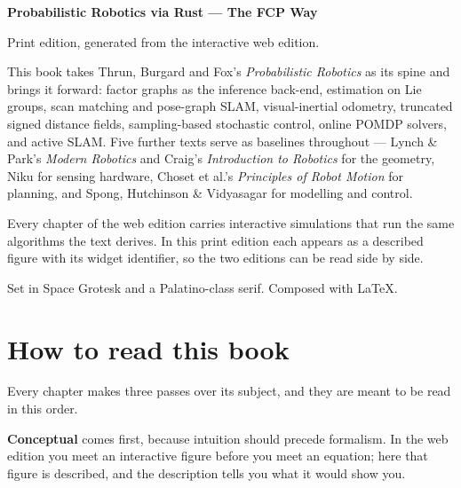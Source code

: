\documentclass[11pt, twoside, openright]{book}
\begin{document}
\cleardoublepage
\thispagestyle{empty}
\vspace*{\fill}
\noindent
{\fontsize{9}{13}\selectfont\color{shInkSecondary}
\textbf{Probabilistic Robotics via Rust --- The FCP Way}\par
\vspace{5pt}
Print edition, generated from the interactive web edition.\par
\vspace{9pt}
This book takes Thrun, Burgard and Fox's \emph{Probabilistic Robotics} as its
spine and brings it forward: factor graphs as the inference back-end, estimation
on Lie groups, scan matching and pose-graph SLAM, visual-inertial odometry,
truncated signed distance fields, sampling-based stochastic control, online
POMDP solvers, and active SLAM. Five further texts serve as baselines throughout
--- Lynch \& Park's \emph{Modern Robotics} and Craig's \emph{Introduction to
Robotics} for the geometry, Niku for sensing hardware, Choset et al.'s
\emph{Principles of Robot Motion} for planning, and Spong, Hutchinson \&
Vidyasagar for modelling and control.\par
\vspace{9pt}
Every chapter of the web edition carries interactive simulations that run the
same algorithms the text derives. In this print edition each appears as a
described figure with its widget identifier, so the two editions can be read
side by side.\par
\vspace{9pt}
{\color{shInkMuted}Set in Space Grotesk and a Palatino-class serif.
Composed with \LaTeX.}\par}
\vspace*{\fill}

\cleardoublepage
\pagestyle{fancy}
\chapter*{How to read this book}

Every chapter makes three passes over its subject, and they are meant to be read
in this order.

\textbf{Conceptual} comes first, because intuition should precede formalism. In
the web edition you meet an interactive figure before you meet an equation; here
that figure is described, and the description tells you what it would show you.
\end{document}
